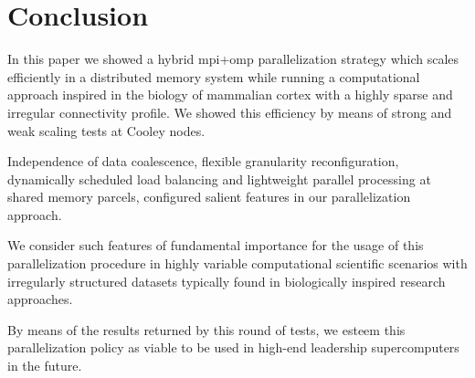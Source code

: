 \documentclass[10pt,journal,compsoc]{IEEEtran}
\begin{document}




\section{Conclusion}

In this paper we showed a hybrid \gls{mpi}+\gls{omp} parallelization strategy which scales efficiently in a distributed memory system while running a computational approach inspired in the biology of mammalian cortex with a highly sparse and irregular connectivity profile. We showed this efficiency by means of strong and weak scaling tests at Cooley nodes.

Independence of data coalescence, flexible granularity reconfiguration, dynamically scheduled load balancing and lightweight parallel processing at shared memory parcels, configured salient features in our parallelization approach.

We consider such features of fundamental importance for the usage of this parallelization procedure in highly variable computational scientific scenarios with irregularly structured datasets typically found in biologically inspired research approaches.

By means of the results returned by this round of tests, we esteem this parallelization policy as viable to be used in high-end leadership supercomputers in the future.





\end{document}
